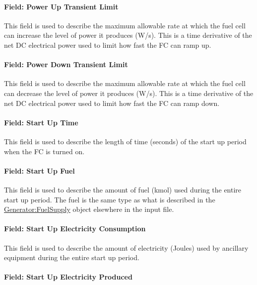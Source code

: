 \paragraph{Field: Power Up Transient Limit}\label{field-power-up-transient-limit}

This field is used to describe the maximum allowable rate at which the fuel cell can increase the level of power it produces (W/s). This is a time derivative of the net DC electrical power used to limit how fast the FC can ramp up.

\paragraph{Field: Power Down Transient Limit}\label{field-power-down-transient-limit}

This field is used to describe the maximum allowable rate at which the fuel cell can decrease the level of power it produces (W/s). This is a time derivative of the net DC electrical power used to limit how fast the FC can ramp down.

\paragraph{Field: Start Up Time}\label{field-start-up-time}

This field is used to describe the length of time (seconds) of the start up period when the FC is turned on.

\paragraph{Field: Start Up Fuel}\label{field-start-up-fuel}

This field is used to describe the amount of fuel (kmol) used during the entire start up period. The fuel is the same type as what is described in the \hyperref[generatorfuelsupply]{Generator:FuelSupply} object elsewhere in the input file.

\paragraph{Field: Start Up Electricity Consumption}\label{field-start-up-electricity-consumption}

This field is used to describe the amount of electricity (Joules) used by ancillary equipment during the entire start up period.

\paragraph{Field: Start Up Electricity Produced}\label{field-start-up-electricity-produced}

